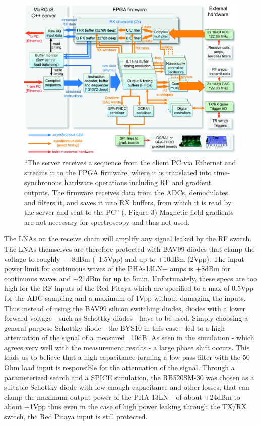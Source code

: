 \begin{figure}[hbt]
    \centering
    \includegraphics{images/marcos.jpg}
    \caption{ \enquote{The server receives a sequence from the client PC via Ethernet and streams it to the FPGA firmware, where it is translated into time-synchronous hardware operations including RF and gradient outputs. The firmware receives data from the ADCs, demodulates and filters it, and saves it into RX buffers, from which it is read by the server and sent to the PC} (\cite{negnevitskyMaRCoSOpensourceElectronic2023}, Figure 3) Magnetic field gradients are not necessary for spectroscopy and thus not used.}
\end{figure}

The LNAs on the receive chain will amplify any signal leaked by the RF switch. The LNAs themselves are therefore protected with BAV99 diodes that clamp the voltage to roughly ~+8dBm (~1.5Vpp) and up to +10dBm (2Vpp). The input power limit for continuous waves of the PHA-13LN+ amps is +8dBm for continuous waves and +21dBm for up to 5min. Unfortunately, these specs are too high for the RF inputs of the Red Pitaya which are specified to a max of 0.5Vpp for the ADC sampling and a maximum of 1Vpp without damaging the inputs. Thus instead of using the BAV99 silicon switching diodes, diodes with a lower forward voltage - such as Schottky diodes - have to be used. Simply choosing a general-purpose Schottky diode - the BYS10 in this case - led to a high attenuation of the signal of a measured ~10dB. As seen in the simulation - which agrees very well with the measurement results - a large phase shift occurs. This leads us to believe that a high capacitance forming a low pass filter with the 50 Ohm load input is responsible for the attenuation of the signal. Through a parameterized search and a SPICE simulation, the RB520SM-30 was chosen as a suitable Schottky diode with low enough capacitance and other losses, that can clamp the maximum output power of the PHA-13LN+ of about +24dBm to about +1Vpp thus even in the case of high power leaking through the TX/RX switch, the Red Pitaya input is still protected.

